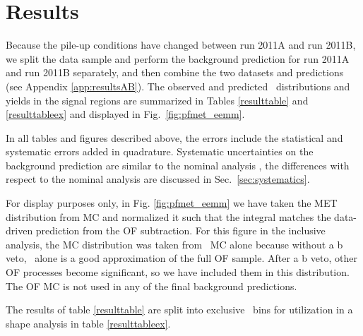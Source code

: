 
\section{Results}
\label{sec:results}


Because the pile-up conditions have changed between run 2011A and run 2011B, 
we split the data sample and perform the background prediction for run 2011A and run 2011B separately,
and then combine the two datasets and predictions (see Appendix \ref{app:resultsAB}).
The observed and predicted \MET\ distributions and yields in the signal regions are
summarized in Tables \ref{resulttable} and \ref{resulttableex}
and displayed in Fig.~\ref{fig:pfmet_eemm}.

In all tables and figures described above, the errors include the statistical and systematic errors 
added in quadrature. Systematic uncertainties on the background prediction are similar to the nominal 
analysis \cite{ref:osznote}, the differences with respect to the nominal analysis are discussed in Sec.~\ref{sec:systematics}.

For display purposes only, in Fig. \ref{fig:pfmet_eemm}
we have taken the
MET distribution from MC and normalized it such that the integral 
matches the data-driven prediction
from the OF subtraction. 
For this figure in the inclusive analysis, the MC distribution 
was taken from \ttbar\ MC alone because without a b veto, 
\ttbar\ alone is a good approximation of the full OF sample.
After a b veto, other OF processes become significant, so we 
have included them in this distribution.
The OF MC is not used in any of the final background predictions.

The results of table \ref{resulttable} are split into exclusive \MET\ bins
for utilization in a shape analysis in table \ref{resulttableex}.


